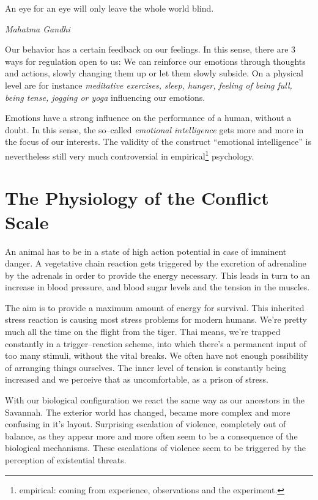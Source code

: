 \documentclass[../main.tex]{subfiles}
\begin{document}
\epigraph{An eye for an eye will only leave the whole world blind.}{\textit{Mahatma Gandhi}}

Our behavior has a certain feedback on our feelings.
In this sense, there are 3 ways for regulation open to us:
We can reinforce our emotions through thoughts and actions,
slowly changing them up
or let them slowly subside.
On a physical level are for instance \emph{meditative exercises, sleep, hunger, feeling of being full, being tense, jogging or yoga} influencing our emotions.

Emotions have a strong influence on the performance of a human, without a doubt.
In this sense, the so--called \emph{emotional intelligence} gets more and more in the focus of our interests.
The validity of the construct ``emotional intelligence'' is nevertheless still very much controversial in
empirical\footnote{empirical: coming from experience, observations and the experiment.} psychology.

\section{The Physiology of the Conflict Scale}

An animal has to be in a state of high action potential in case of imminent danger.
A vegetative chain reaction gets triggered by the excretion of adrenaline by the adrenals in order to provide the energy necessary.
This leads in turn to an increase in blood pressure, and blood sugar levels and the tension in the muscles.

The aim is to provide a maximum amount of energy for survival.
This inherited stress reaction is causing most stress problems for modern humans.
We're pretty much all the time on the flight from the tiger.
Thai means, we're trapped constantly in a trigger--reaction scheme, into which there's a permanent input of too many stimuli, without the vital breaks.
We often have not enough possibility of arranging things ourselves.
The inner level of tension is constantly being increased and we perceive that as uncomfortable, as a prison of stress.

With our biological configuration we react the same way as our ancestors in the Savannah.
The exterior world has changed, became more complex and more confusing in it's layout.
Surprising escalation of violence, completely out of balance, as they appear more and more often seem to be a consequence of the biological mechanisms.
These escalations of violence seem to be triggered by the perception of existential threats.
\end{document}

